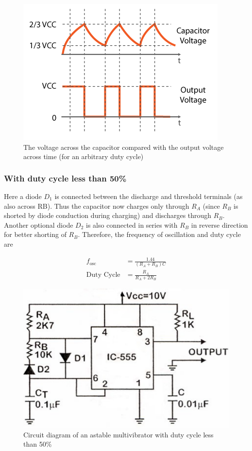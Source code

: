 \begin{figure}[H]
    \centering
    \includegraphics[width=0.90\columnwidth]{images/ast2.png}
    \caption{The voltage across the capacitor compared with the output voltage across time (for an arbitrary duty cycle)}
    \label{ast2}
\end{figure}

\subsubsection{With duty cycle less than 50\%}
Here a diode $D_1$ is connected between the discharge and threshold terminals (as also
across RB). Thus the capacitor now charges only through $R_A$ (since $R_B$ is shorted by diode
conduction during charging) and discharges through $R_B$. Another optional diode $D_2$ is
also connected in series with $R_B$ in reverse direction for better shorting of $R_B$. Therefore,
the frequency of oscillation and duty cycle are

\begin{align}
    f_\text{osc} &= \frac{1.44}{(R_A+R_B)C}\\
    \text{Duty Cycle} &= \frac{R_A}{R_A+2R_B}
\end{align}

\begin{figure}[H]
    \centering
    \includegraphics[width=0.7\columnwidth]{images/ast3.png}
    \caption{Circuit diagram of an astable multivibrator with duty cycle less than 50\%}
    \label{ast3}
\end{figure}

